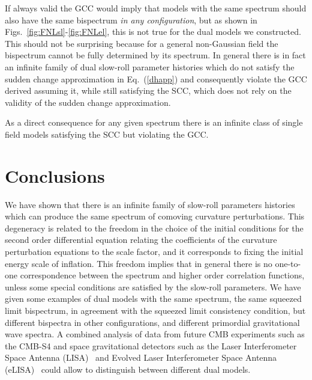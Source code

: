 \documentclass[aps,prl,amsmath,nofootinbib,twocolumn]{revtex4}
\newcommand{\3}{\partial}
\newcommand{\4}{\frac}
\newcommand{\5}{\delta}
\renewcommand\({\left(}
\renewcommand\){\right)}
\renewcommand\[{\left[}
\renewcommand\]{\right]}
\begin{document}
If always valid the GCC  would imply that models with the  same spectrum should also have the same bispectrum  \textit{in any configuration}, but as shown in Figs.~\ref{fig:FNLsl}-\ref{fig:FNLel}, this is not true for the dual models we constructed. This should not be surprising because for a general non-Gaussian field the bispectrum cannot be fully determined  by its spectrum.
In general there is in fact an infinite family  of dual slow-roll parameter histories which do not satisfy the sudden change approximation in Eq.~(\ref{dhapp}) and consequently violate  the GCC derived assuming it, while still satisfying the SCC, which does not rely on the validity of the sudden change approximation.

As a direct consequence for any given spectrum there is an infinite class of single field models  satisfying the SCC but violating the GCC.%

\section{Conclusions}
We have shown that there is an infinite family of slow-roll parameters histories which can produce the same spectrum of comoving curvature perturbations. This degeneracy is related to the freedom in the choice of the initial conditions for the second order differential equation relating the coefficients of the curvature perturbation equations to the scale factor, and it corresponds to fixing the initial energy scale of inflation.
This freedom implies that in general there is no one-to-one correspondence between the spectrum and higher order correlation functions, unless some special conditions are satisfied by the slow-roll parameters. 
We have given  some examples of dual models  with the same spectrum, the same squeezed limit bispectrum, in agreement with the squeezed limit consistency condition, but different bispectra in other configurations, and different primordial gravitational wave spectra. A combined analysis of data from future CMB experiments such as the CMB-S4 \cite{Abazajian:2016yjj} and  space gravitational detectors such as the Laser Interferometer Space Antenna (LISA)~\cite{2017arXiv170200786A} and Evolved Laser Interferometer Space
Antenna (eLISA)~\cite{Seoane:2013qna}  could allow to distinguish  between different dual models.



\end{document}
